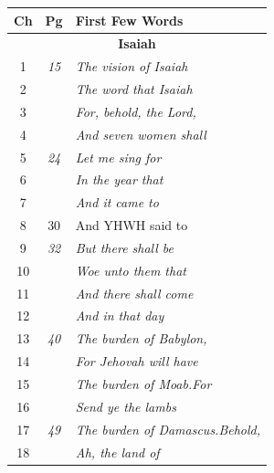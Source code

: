 \documentclass{article}
\newlength{\minipageheight}
\begin{document}
\begin{minipage}[r][\minipageheight][t]{3in}%
    \begin{longtable}{ccl}
        \textbf{Ch} & \textbf{Pg}  & \textbf{First Few Words}                \\%
        \hline%
        \endfirsthead%
        \multicolumn{3}{c}{\textbf{Isaiah}}                                  \\
        \hline
        1           & \textit{15}  & \textit{The vision of Isaiah}           \\
        2           &              & \textit{The word that Isaiah}           \\
        3           &              & \textit{For, behold, the Lord,}         \\
        4           &              & \textit{And seven women shall}          \\
        5           & \textit{24}  & \textit{Let me sing for}                \\
        6           &              & \textit{In the year that}               \\
        7           &              & \textit{And it came to}                 \\
        8           & 30           & And YHWH said to                        \\
        9           & \textit{32}  & \textit{But there shall be}             \\
        10          &              & \textit{Woe unto them that}             \\
        11          &              & \textit{And there shall come}           \\
        12          &              & \textit{And in that day}                \\
        13          & \textit{40}  & \textit{The burden of Babylon,}         \\
        14          &              & \textit{For Jehovah will have}          \\
        15          &              & \textit{The burden of Moab.For}         \\
        16          &              & \textit{Send ye the lambs}              \\
        17          & \textit{49}  & \textit{The burden of Damascus.Behold,} \\
        18          &              & \textit{Ah, the land of}                \\

\end{longtable}
\end{minipage}
\end{document}
